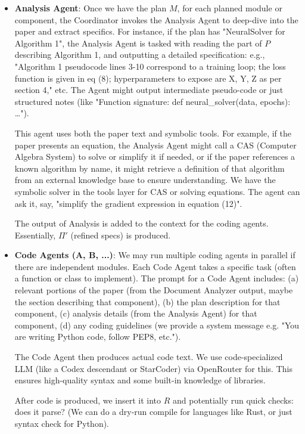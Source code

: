 \documentclass{ieeeaccess}
\begin{document}
\begin{itemize}
\item \textbf{Analysis Agent}: Once we have the plan $M$, for each planned module or component, the Coordinator invokes the Analysis Agent to deep-dive into the paper and extract specifics. For instance, if the plan has "NeuralSolver for Algorithm 1", the Analysis Agent is tasked with reading the part of $P$ describing Algorithm 1, and outputting a detailed specification: e.g., "Algorithm 1 pseudocode lines 3-10 correspond to a training loop; the loss function is given in eq (8); hyperparameters to expose are X, Y, Z as per section 4," etc. The Agent might output intermediate pseudo-code or just structured notes (like "Function signature: def neural\_solver(data, epochs): \ldots").

This agent uses both the paper text and symbolic tools. For example, if the paper presents an equation, the Analysis Agent might call a CAS (Computer Algebra System) to solve or simplify it if needed, or if the paper references a known algorithm by name, it might retrieve a definition of that algorithm from an external knowledge base to ensure understanding. We have the symbolic solver in the tools layer for CAS or solving equations. The agent can ask it, say, "simplify the gradient expression in equation (12)".

The output of Analysis is added to the context for the coding agents. Essentially, $\Pi'$ (refined specs) is produced.

\item \textbf{Code Agents (A, B, ...)}: We may run multiple coding agents in parallel if there are independent modules. Each Code Agent takes a specific task (often a function or class to implement). The prompt for a Code Agent includes: (a) relevant portions of the paper (from the Document Analyzer output, maybe the section describing that component), (b) the plan description for that component, (c) analysis details (from the Analysis Agent) for that component, (d) any coding guidelines (we provide a system message e.g. "You are writing Python code, follow PEP8, etc.").

The Code Agent then produces actual code text. We use code-specialized LLM (like a Codex descendant or StarCoder) via OpenRouter for this. This ensures high-quality syntax and some built-in knowledge of libraries.

After code is produced, we insert it into $R$ and potentially run quick checks: does it parse? (We can do a dry-run compile for languages like Rust, or just syntax check for Python).


\end{itemize}
\end{document}
